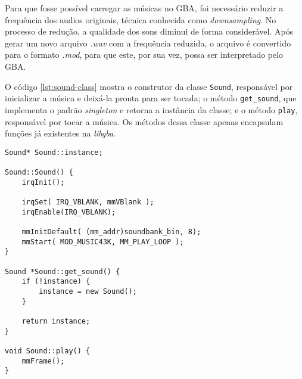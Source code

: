 Para que fosse possível carregar as músicas no GBA, foi necessário reduzir a frequência dos audios originais, técnica conhecida como \textit{downsampling}. No processo de redução, a qualidade dos sons diminui de forma considerável. Após gerar um novo arquivo \textit{.wav} com a frequência reduzida, o arquivo é convertido para o formato \textit{.mod}, para que este, por sua vez, possa ser interpretado pelo GBA.

O código \ref{lst:sound-class} mostra o construtor da classe \texttt{Sound}, responsável por inicializar a música e deixá-la pronta para ser tocada; o método \texttt{get\_sound}, que implementa o padrão \textit{singleton} e retorna a instância da classe; e o método \texttt{play}, responsável por tocar a música. Os métodos dessa classe apenas encapsulam funções já existentes na \textit{libgba}.

\begin{lstlisting}[caption={Classe \texttt{Sound}},label={lst:sound-class}]
Sound* Sound::instance;

Sound::Sound() {
    irqInit();

    irqSet( IRQ_VBLANK, mmVBlank );
    irqEnable(IRQ_VBLANK);

    mmInitDefault( (mm_addr)soundbank_bin, 8);
    mmStart( MOD_MUSIC43K, MM_PLAY_LOOP );
}

Sound *Sound::get_sound() {
    if (!instance) {
        instance = new Sound();
    }

    return instance;
}

void Sound::play() {
    mmFrame();
}
\end{lstlisting}

